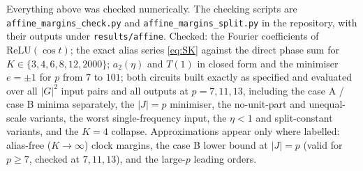 \documentclass[11pt]{article}
\theoremstyle{remark}
\newcommand{\relu}{\mathrm{ReLU}}
\newcommand{\abs}[1]{\lvert #1 \rvert}
\begin{document}
Everything above was checked numerically. The checking scripts are \texttt{affine\_margins\_check.py} and
\texttt{affine\_margins\_split.py} in the repository, with their outputs under \texttt{results/affine}. Checked:
the Fourier coefficients of $\relu(\cos t)$; the exact alias series \eqref{eq:SK} against the direct phase sum for
$K \in \{3, 4, 6, 8, 12, 2000\}$; $a_2(\eta)$ and $T(1)$ in closed form and the minimiser $e = \pm 1$ for $p$ from $7$ to $101$;
both circuits built exactly as specified and
evaluated over all $\abs{G}^2$ input pairs and all outputs at $p = 7, 11, 13$, including the case A / case B minima separately, the
$\abs{J} = p$ minimiser, the no-unit-part and unequal-scale variants, the worst single-frequency input, the $\eta < 1$ and split-constant
variants, and the $K = 4$ collapse. Approximations appear only where labelled: alias-free ($K \to \infty$) clock margins, the case B lower
bound at $\abs{J} = p$ (valid for $p \ge 7$, checked at $7, 11, 13$), and the large-$p$ leading orders.
\end{document}
